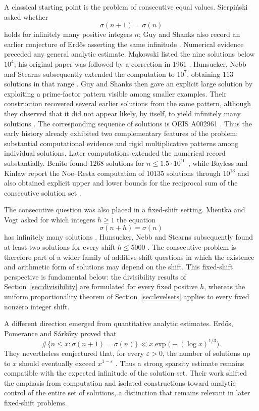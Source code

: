 \documentclass[11pt,reqno]{amsart}
\numberwithin{equation}{section}
\theoremstyle{plain}
\theoremstyle{definition}
\theoremstyle{remark}
\begin{document}
A classical starting point is the problem of consecutive equal values. Sierpi\'nski asked whether
\[
\sigma(n+1)=\sigma(n)
\]
holds for infinitely many positive integers $n$; Guy and Shanks also record an earlier conjecture of Erd\H{o}s asserting the same infinitude \cite{GuyShanks1974}. Numerical evidence preceded any general analytic estimate. M\k{a}kowski listed the nine solutions below $10^4$; his original paper was followed by a correction in 1961 \cite{Makowski1960,MakowskiCorr1961}. Hunsucker, Nebb and Stearns subsequently extended the computation to $10^7$, obtaining $113$ solutions in that range \cite{HunsuckerNebbStearns1973}. Guy and Shanks then gave an explicit large solution by exploiting a prime-factor pattern visible among smaller examples. Their construction recovered several earlier solutions from the same pattern, although they observed that it did not appear likely, by itself, to yield infinitely many solutions \cite{GuyShanks1974}. The corresponding sequence of solutions is OEIS A002961
\cite{OEIS2026}. Thus the early history already exhibited two complementary features of the problem: substantial computational evidence and rigid multiplicative patterns among individual solutions.
Later computations extended the numerical record substantially. Benito found $1268$ solutions for $n\le 1.5\cdot 10^{10}$ \cite{Benito2007}, while Bayless and Kinlaw report the Noe--Resta computation of $10135$ solutions through $10^{13}$ and also obtained explicit upper and lower bounds for the reciprocal sum of the consecutive solution set \cite{BaylessKinlaw2015}.

The consecutive question was also placed in a fixed-shift setting. Mientka and Vogt asked for which integers $h\ge1$ the equation
\[
\sigma(n+h)=\sigma(n)
\]
has infinitely many solutions \cite{MientkaVogt1970}. Hunsucker, Nebb and Stearns subsequently found at least two solutions for every shift $h\le5000$ \cite{HunsuckerNebbStearns1973,Weingartner2011}. The consecutive problem is therefore part of a wider family of additive-shift questions in which the existence and arithmetic form of solutions may depend on the shift. This fixed-shift perspective is fundamental below: the divisibility results of Section~\ref{sec:divisibility} are formulated for every fixed positive $h$, whereas the uniform proportionality theorem of
Section~\ref{sec:levelsets} applies to every fixed nonzero integer shift.

A different direction emerged from quantitative analytic estimates. Erd\H{o}s, Pomerance and S\'ark\H{o}zy proved that
\[
\#\{n\le x:\sigma(n+1)=\sigma(n)\}
\ll
x\exp\!\bigl(-(\log x)^{1/3}\bigr).
\]
They nevertheless conjectured that, for every $\varepsilon>0$, the number of solutions up to $x$ should eventually exceed $x^{1-\varepsilon}$ \cite{ErdosPomeranceSarkozy1987}. Thus a strong sparsity estimate remains compatible with the expected infinitude of the solution set. Their work shifted the emphasis from computation and isolated constructions toward analytic control of the entire set of solutions, a distinction that remains relevant in later fixed-shift problems.
\end{document}
